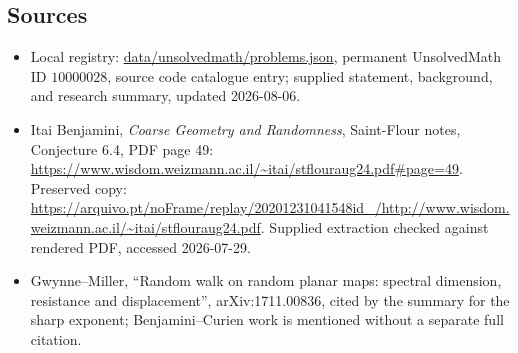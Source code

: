 \documentclass[11pt]{article}
\begin{document}
\subsection{Sources}
\begin{itemize}
\item Local registry: \url{data/unsolvedmath/problems.json}, permanent UnsolvedMath ID \(10000028\), source code catalogue entry; supplied statement, background, and research summary, updated 2026-08-06.
\item Itai Benjamini, \emph{Coarse Geometry and Randomness}, Saint-Flour notes, Conjecture 6.4, PDF page 49: \url{https://www.wisdom.weizmann.ac.il/~itai/stflouraug24.pdf#page=49}. Preserved copy: \url{https://arquivo.pt/noFrame/replay/20201231041548id_/http://www.wisdom.weizmann.ac.il/~itai/stflouraug24.pdf}. Supplied extraction checked against rendered PDF, accessed 2026-07-29.
\item Gwynne--Miller, ``Random walk on random planar maps: spectral dimension, resistance and displacement'', arXiv:1711.00836, cited by the summary for the sharp exponent; Benjamini--Curien work is mentioned without a separate full citation.
\end{itemize}
\end{document}
